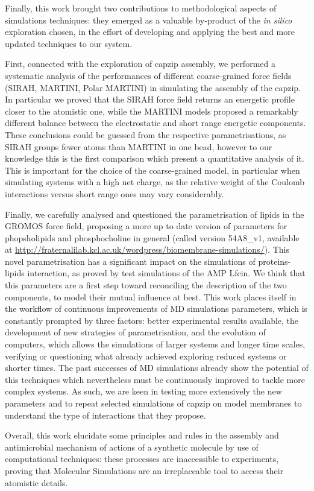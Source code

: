 Finally, this work brought two contributions to methodological aspects of simulations techniques: they emerged as a valuable by-product of the \emph{in silico} exploration chosen, in the effort of developing and applying the best and more updated techniques to our system.

First, connected with the exploration of capzip assembly, we performed a systematic analysis of the performances of different coarse-grained force fields (SIRAH, MARTINI, Polar MARTINI) in simulating the assembly of the capzip. In particular we proved that the SIRAH force field returns an energetic profile closer to the atomistic one, while the MARTINI models proposed a remarkably different balance between the electrostatic and short range energetic components. These conclusions could be guessed from the respective parametrisations, as SIRAH groups fewer atoms than MARTINI in one bead, however to our knowledge this is the first comparison which present a quantitative analysis of it.
%
This is important for the choice of the coarse-grained model, in particular when simulating systems with a high net charge, as the relative weight of the Coulomb interactions versus short range ones may vary considerably.

Finally, we carefully analysed and questioned the parametrisation of lipids in the GROMOS force field, proposing a more up to date version of parameters for phopsholipids and phosphocholine in general (called version 54A8\_v1, available at \url{http://fraternalilab.kcl.ac.uk/wordpress/biomembrane-simulations/}). This novel parametrisation has a significant impact on the simulations of proteins-lipids interaction, as proved by test simulations of the AMP Lfcin. We think that this parameters are a first step toward reconciling the description of the two components, to model their mutual influence at best.
%
This work places itself in the workflow of continuous improvements of MD simulations parameters, which is constantly prompted by three factors: better experimental results available, the development of new strategies of parametrisation, and the evolution of computers, which allows the simulations of larger systems and longer time scales, verifying or questioning what already achieved exploring reduced systems or shorter times.
%
The past successes of MD simulations already show the potential of this techniques which nevertheless must be continuously improved to tackle more complex systems.
As such, we are keen in testing more extensively the new parameters and to repeat selected simulations of capzip on model membranes to understand the type of interactions that they propose.

Overall, this work elucidate some principles and rules in the assembly and antimicrobial mechanism of actions of a synthetic molecule by use of computational techniques: these processes are inaccessible to experiments, proving that Molecular Simulations are an irreplaceable tool to access their atomistic details.


